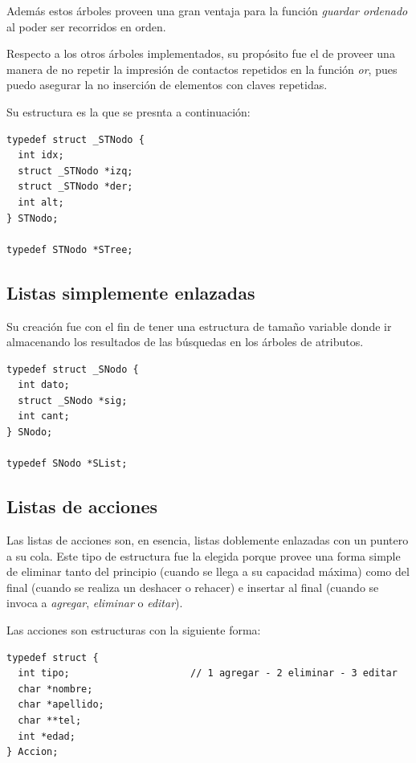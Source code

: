 \documentclass[11pt]{article}
\begin{document}
Adem\'as estos \'arboles proveen una gran ventaja para la funci\'on \emph{guardar ordenado} al poder ser recorridos en orden.

Respecto a los otros \'arboles implementados, su prop\'osito fue el de proveer una manera de no repetir la impresi\'on de contactos repetidos en la funci\'on \emph{or}, 
pues puedo asegurar la no inserci\'on de elementos con claves repetidas. 

Su estructura es la que se presnta a continuaci\'on:

\begin{lstlisting}[style = CStyle]
typedef struct _STNodo {
  int idx;
  struct _STNodo *izq;
  struct _STNodo *der;
  int alt;
} STNodo;

typedef STNodo *STree;
\end{lstlisting}

\vspace{1cm}

\subsection{Listas simplemente enlazadas}

Su creaci\'on fue con el fin de tener una estructura de tamaño variable donde ir almacenando los resultados de las b\'usquedas en los \'arboles de atributos.

\begin{lstlisting}[style = CStyle]
typedef struct _SNodo {
  int dato;
  struct _SNodo *sig;
  int cant;
} SNodo;

typedef SNodo *SList;
\end{lstlisting}

\subsection{Listas de acciones}
Las listas de acciones son, en esencia, listas doblemente enlazadas con un puntero a su cola. 
Este tipo de estructura fue la elegida porque provee una forma simple de eliminar tanto del principio (cuando se llega a su capacidad m\'axima) como del final (cuando se realiza un deshacer o rehacer)
e insertar al final (cuando se invoca a \emph{agregar}, \emph{eliminar} o \emph{editar}).

Las acciones son estructuras con la siguiente forma: 

\begin{lstlisting}[style = CStyle]
typedef struct {
  int tipo;                     // 1 agregar - 2 eliminar - 3 editar 
  char *nombre;
  char *apellido;
  char **tel;
  int *edad;
} Accion;
\end{lstlisting}
\end{document}

